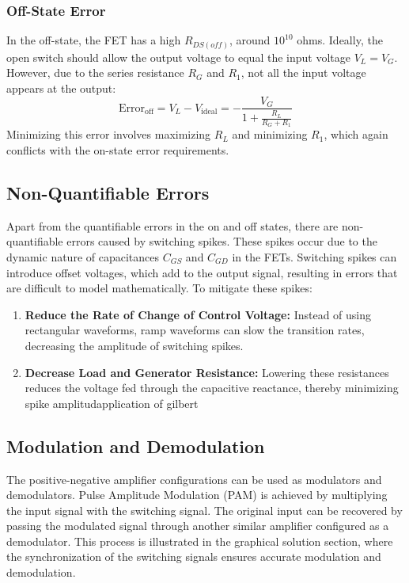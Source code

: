\documentclass[a4paper,9pt,twoside,openany,twocolumn]{memoir}
\begin{document}
\subsubsection{Off-State Error}
In the off-state, the FET has a high \( R_{DS(off)} \), around \( 10^{10} \) ohms. Ideally, the open switch should allow the output voltage to equal the input voltage \( V_L = V_G \). However, due to the series resistance \( R_G \) and \( R_1 \), not all the input voltage appears at the output:
\[
\text{Error}_{\text{off}} = V_L - V_{\text{ideal}} = -\frac{V_G}{1 + \frac{R_L}{R_G + R_1}}
\]
Minimizing this error involves maximizing \( R_L \) and minimizing \( R_1 \), which again conflicts with the on-state error requirements.

\subsection{Non-Quantifiable Errors}
Apart from the quantifiable errors in the on and off states, there are non-quantifiable errors caused by switching spikes. These spikes occur due to the dynamic nature of capacitances \( C_{GS} \) and \( C_{GD} \) in the FETs. Switching spikes can introduce offset voltages, which add to the output signal, resulting in errors that are difficult to model mathematically. To mitigate these spikes:
\begin{enumerate}
    \item \textbf{Reduce the Rate of Change of Control Voltage:} Instead of using rectangular waveforms, ramp waveforms can slow the transition rates, decreasing the amplitude of switching spikes.
    \item \textbf{Decrease Load and Generator Resistance:} Lowering these resistances reduces the voltage fed through the capacitive reactance, thereby minimizing spike amplitudapplication of gilbert
    
\end{enumerate}

\subsection{Modulation and Demodulation}
The positive-negative amplifier configurations can be used as modulators and demodulators. Pulse Amplitude Modulation (PAM) is achieved by multiplying the input signal with the switching signal. The original input can be recovered by passing the modulated signal through another similar amplifier configured as a demodulator. This process is illustrated in the graphical solution section, where the synchronization of the switching signals ensures accurate modulation and demodulation.
\end{document}
